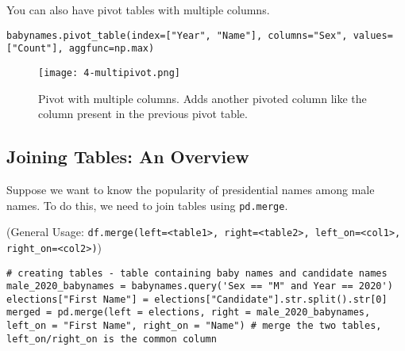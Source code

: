 You can also have pivot tables with multiple columns.
\begin{verbatim}
babynames.pivot_table(index=["Year", "Name"], columns="Sex", values=["Count"], aggfunc=np.max)
\end{verbatim}
\begin{figure}[ht]
\texttt{[image: 4-multipivot.png]}\centering\caption{Pivot with multiple columns. Adds another pivoted column like the column present in the previous pivot table.}
\end{figure}

\subsection{Joining Tables: An Overview}
Suppose we want to know the popularity of presidential names among male names. To do this, we need to join tables using \texttt{pd.merge}.

(General Usage: \texttt{df.merge(left=<table1>, right=<table2>, left_on=<col1>, right_on=<col2>)})

\begin{verbatim}
# creating tables - table containing baby names and candidate names
male_2020_babynames = babynames.query('Sex == "M" and Year == 2020')
elections["First Name"] = elections["Candidate"].str.split().str[0]
merged = pd.merge(left = elections, right = male_2020_babynames, left_on = "First Name", right_on = "Name") # merge the two tables, left_on/right_on is the common column
\end{verbatim}


